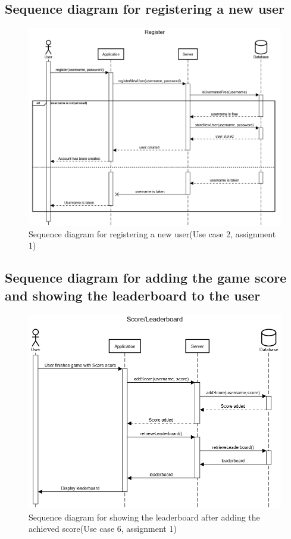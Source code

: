 \documentclass[10pt]{article}
\begin{document}
	\subsection{Sequence diagram for registering a new user}
		\begin{figure}[H]
			\includegraphics[width=\linewidth]{latex_images/sequenceRegister.png}
			\caption{Sequence diagram for registering a new user(Use case 2, assignment 1)}
		\end{figure}
	\subsection{Sequence diagram for adding the game score and showing the leaderboard to the user}
		\begin{figure}[H]
			\includegraphics[width=\linewidth]{latex_images/sequenceLeaderboard.png}
			\caption{Sequence diagram for showing the leaderboard after adding the achieved score(Use case 6, assignment 1)}
		\end{figure}
\end{document}
